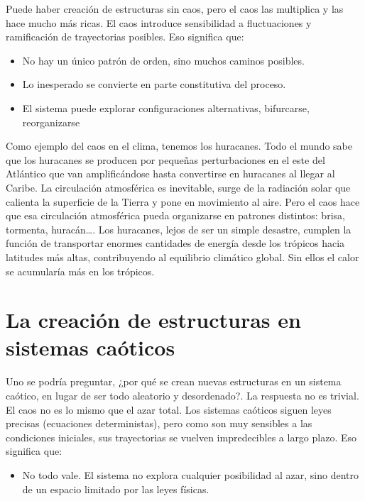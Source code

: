 \documentclass[
  10pt,
  a4paper,
  DIV=11,
  numbers=noendperiod,
  open=any]{scrreprt}
\providecommand{\tightlist}{%
  \setlength{\itemsep}{0pt}\setlength{\parskip}{0pt}}
\numberwithin{equation}{chapter}
\numberwithin{equation}{section}
\renewcommand{\[}{\begin{equation}}
\renewcommand{\]}{\end{equation}}
\begin{document}
Puede haber creación de estructuras sin caos, pero el caos las
multiplica y las hace mucho más ricas. El caos introduce sensibilidad a
fluctuaciones y ramificación de trayectorias posibles. Eso significa
que:

\begin{itemize}
\item
  No hay un único patrón de orden, sino muchos caminos posibles.
\item
  Lo inesperado se convierte en parte constitutiva del proceso.
\item
  El sistema puede explorar configuraciones alternativas, bifurcarse,
  reorganizarse
\end{itemize}

Como ejemplo del caos en el clima, tenemos los huracanes. Todo el mundo
sabe que los huracanes se producen por pequeñas perturbaciones en el
este del Atlántico que van amplificándose hasta convertirse en huracanes
al llegar al Caribe. La circulación atmosférica es inevitable, surge de
la radiación solar que calienta la superficie de la Tierra y pone en
movimiento al aire. Pero el caos hace que esa circulación atmosférica
pueda organizarse en patrones distintos: brisa, tormenta, huracán\ldots.
Los huracanes, lejos de ser un simple desastre, cumplen la función de
transportar enormes cantidades de energía desde los trópicos hacia
latitudes más altas, contribuyendo al equilibrio climático global. Sin
ellos el calor se acumularía más en los trópicos.

\section{La creación de estructuras en sistemas
caóticos}\label{la-creaciuxf3n-de-estructuras-en-sistemas-cauxf3ticos}

Uno se podría preguntar, ¿por qué se crean nuevas estructuras en un
sistema caótico, en lugar de ser todo aleatorio y desordenado?. La
respuesta no es trivial. El caos no es lo mismo que el azar total. Los
sistemas caóticos siguen leyes precisas (ecuaciones deterministas), pero
como son muy sensibles a las condiciones iniciales, sus trayectorias se
vuelven impredecibles a largo plazo. Eso significa que:

\begin{itemize}
\tightlist
\item
  No todo vale. El sistema no explora cualquier posibilidad al azar,
  sino dentro de un espacio limitado por las leyes físicas.
\end{itemize}
\end{document}
